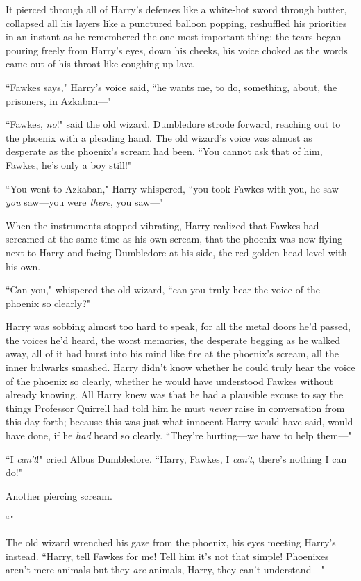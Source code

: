 It pierced through all of Harry's defenses like a white-hot sword through butter, collapsed all his layers like a punctured balloon popping, reshuffled his priorities in an instant as he remembered the one most important thing; the tears began pouring freely from Harry's eyes, down his cheeks, his voice choked as the words came out of his throat like coughing up lava---

``Fawkes says," Harry's voice said, ``he wants me, to do, something, about, the prisoners, in Azkaban---"

``Fawkes, \emph{no}!" said the old wizard. Dumbledore strode forward, reaching out to the phoenix with a pleading hand. The old wizard's voice was almost as desperate as the phoenix's scream had been. ``You cannot ask that of him, Fawkes, he's only a boy still!"

``You went to Azkaban," Harry whispered, ``you took Fawkes with you, he saw---\emph{you} saw---you were \emph{there}, you saw---"

When the instruments stopped vibrating, Harry realized that Fawkes had screamed at the same time as his own scream, that the phoenix was now flying next to Harry and facing Dumbledore at his side, the red-golden head level with his own.

``Can you," whispered the old wizard, ``can you truly hear the voice of the phoenix so clearly?"

Harry was sobbing almost too hard to speak, for all the metal doors he'd passed, the voices he'd heard, the worst memories, the desperate begging as he walked away, all of it had burst into his mind like fire at the phoenix's scream, all the inner bulwarks smashed. Harry didn't know whether he could truly hear the voice of the phoenix so clearly, whether he would have understood Fawkes without already knowing. All Harry knew was that he had a plausible excuse to say the things Professor Quirrell had told him he must \emph{never} raise in conversation from this day forth; because this was just what innocent-Harry would have said, would have done, if he \emph{had} heard so clearly. ``They're hurting---we have to help them---"

``I \emph{can't}!" cried Albus Dumbledore. ``Harry, Fawkes, I \emph{can't}, there's nothing I can do!"

Another piercing scream.

``"

The old wizard wrenched his gaze from the phoenix, his eyes meeting Harry's instead. ``Harry, tell Fawkes for me! Tell him it's not that simple! Phoenixes aren't mere animals but they \emph{are} animals, Harry, they can't understand---"

